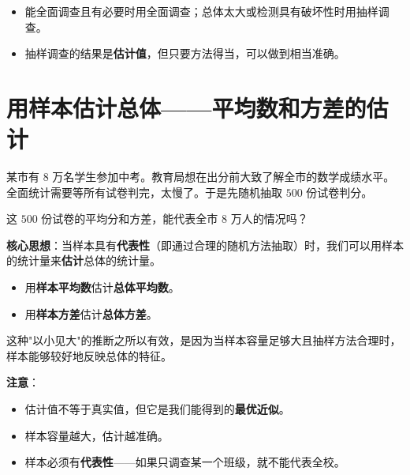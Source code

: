 \begin{keytakeaway}


\begin{itemize}
  \item 能全面调查且有必要时用全面调查；总体太大或检测具有破坏性时用抽样调查。
  \item 抽样调查的结果是\textbf{估计值}，但只要方法得当，可以做到相当准确。
\end{itemize}


\end{keytakeaway}



\section*{用样本估计总体——平均数和方差的估计}


\begin{explore}


某市有 $8$ 万名学生参加中考。教育局想在出分前大致了解全市的数学成绩水平。全面统计需要等所有试卷判完，太慢了。于是先随机抽取 $500$ 份试卷判分。

这 $500$ 份试卷的平均分和方差，能代表全市 $8$ 万人的情况吗？

\end{explore}

\begin{understand}


\textbf{核心思想}：当样本具有\textbf{代表性}（即通过合理的随机方法抽取）时，我们可以用样本的统计量来\textbf{估计}总体的统计量。

\begin{itemize}
  \item 用\textbf{样本平均数}估计\textbf{总体平均数}。
  \item 用\textbf{样本方差}估计\textbf{总体方差}。
\end{itemize}


这种"以小见大"的推断之所以有效，是因为当样本容量足够大且抽样方法合理时，样本能够较好地反映总体的特征。

\textbf{注意}：
\begin{itemize}
  \item 估计值不等于真实值，但它是我们能得到的\textbf{最优近似}。
  \item 样本容量越大，估计越准确。
  \item 样本必须有\textbf{代表性}——如果只调查某一个班级，就不能代表全校。
\end{itemize}


\end{understand}

